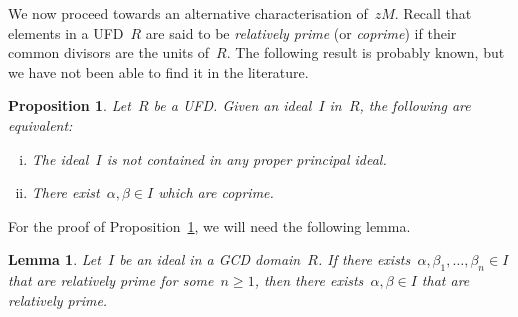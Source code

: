 \documentclass[10.9pt,a4paper]{amsart}
\newtheorem{lemma}[theorem]{Lemma}
\newtheorem{proposition}[theorem]{Proposition}
\theoremstyle{definition}
\theoremstyle{remark}
\begin{document}
\medskip

We now proceed towards an alternative characterisation of~$zM$.
Recall that elements in a UFD~$R$ are said to be {\em relatively prime\/} (or {\em coprime\/})
if their common divisors are the units of~$R$.
The following result is probably known, but we have not been able to find it in the literature.

\begin{proposition}
\label{prop:pseudonull}
Let~$R$ be a UFD. Given an ideal~$I$ in~$R$, the following are equivalent:
\begin{enumerate}[(i)]
\item The ideal~$I$ is not contained in any proper principal ideal.
\item There exist~$\alpha,\beta\in I$ which are coprime.
\end{enumerate}
\end{proposition} 

For the proof of Proposition~\ref{prop:pseudonull}, we will need the following lemma.

\begin{lemma}
\label{lemma:gcd}
Let~$I$ be an ideal in a GCD domain~$R$. If there exists~$\alpha,\beta_1,\dots,\beta_n \in I$ that are relatively prime for some~$n\ge 1$, then there exists~$\alpha, \beta \in I$ that are relatively prime.
\end{lemma}
\end{document}
